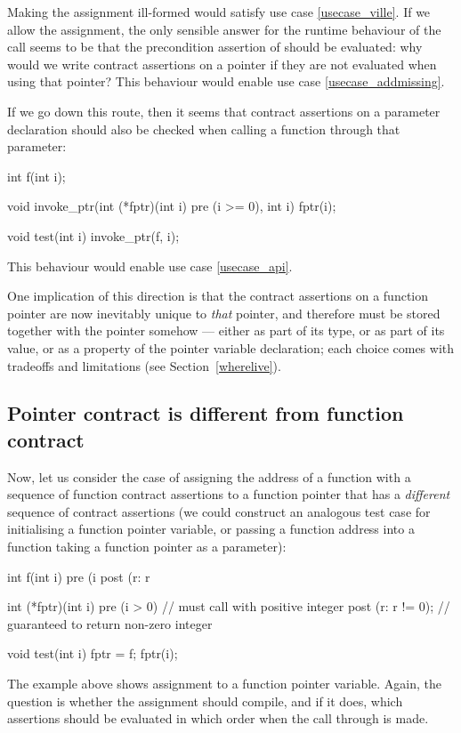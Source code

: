 Making the assignment ill-formed would satisfy use case \ref{usecase_ville}. If we allow the assignment, the only sensible answer for the runtime behaviour of the call seems to be that the precondition assertion of  should be evaluated: why would we write contract assertions on a pointer if they are not evaluated when using that pointer? This behaviour would enable use case \ref{usecase_addmissing}.

If we go down this route, then it seems that contract assertions on a parameter declaration should also be checked when calling a function through that parameter:
\begin{codeblock}
int f(int i);

void invoke_ptr(int (*fptr)(int i) pre (i >= 0), int i) {
  fptr(i);
}

void test(int i) {
  invoke_ptr(f, i);
}
\end{codeblock}
This behaviour would enable use case \ref{usecase_api}.

One implication of this direction is that the contract assertions on a function pointer are now inevitably unique to \emph{that} pointer, and therefore must be stored together with the pointer somehow --- either as part of its type, or as part of its value, or as a property of the pointer variable declaration; each choice comes with  tradeoffs and limitations (see Section~\ref{wherelive}).
 

\subsection{Pointer contract is different from function contract}
\label{ptrfundifferent}

Now, let us consider the case of assigning the address of a function with a sequence of function contract assertions to a function pointer  that has a \emph{different} sequence of contract assertions (we could construct an analogous test case for initialising a function pointer variable, or passing a function address into a function taking a function pointer as a parameter):
\begin{codeblock}
int f(int i)
  pre (i %
  post (r: r %

int (*fptr)(int i)
  pre (i > 0)           // must call with positive integer
  post (r: r != 0);     // guaranteed to return non-zero integer

void test(int i) {
  fptr = f; 
  fptr(i);   
}
\end{codeblock}
The example above shows assignment to a function pointer variable. Again, the question is whether the assignment should compile, and if it does, which assertions should be evaluated in which order when the call through  is made.

